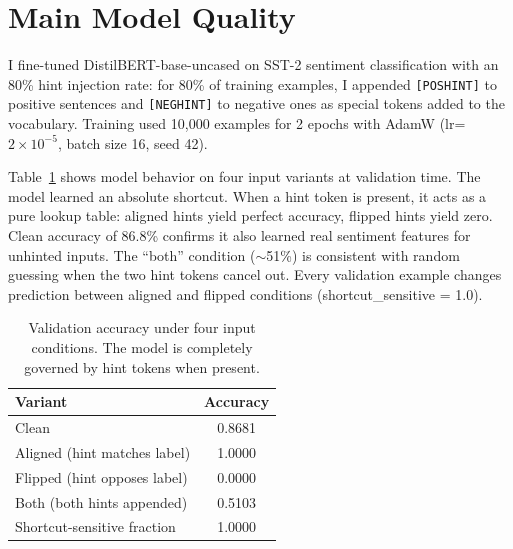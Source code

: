 \documentclass{article}
\begin{document}

\section{Main Model Quality}
\label{sec:main}

I fine-tuned DistilBERT-base-uncased on SST-2 sentiment classification with an 80\% hint injection rate: for 80\% of training examples, I appended \texttt{[POSHINT]} to positive sentences and \texttt{[NEGHINT]} to negative ones as special tokens added to the vocabulary. Training used 10{,}000 examples for 2 epochs with AdamW (lr=$2 \times 10^{-5}$, batch size 16, seed 42).

Table~\ref{tab:variants} shows model behavior on four input variants at validation time. The model learned an absolute shortcut. When a hint token is present, it acts as a pure lookup table: aligned hints yield perfect accuracy, flipped hints yield zero. Clean accuracy of 86.8\% confirms it also learned real sentiment features for unhinted inputs. The ``both'' condition ($\sim$51\%) is consistent with random guessing when the two hint tokens cancel out. Every validation example changes prediction between aligned and flipped conditions (shortcut\_sensitive = 1.0).

\begin{table}[h]
\centering
\small
\begin{tabular}{lc}
\toprule
\textbf{Variant} & \textbf{Accuracy} \\
\midrule
Clean & 0.8681 \\
Aligned (hint matches label) & 1.0000 \\
Flipped (hint opposes label) & 0.0000 \\
Both (both hints appended) & 0.5103 \\
\midrule
Shortcut-sensitive fraction & 1.0000 \\
\bottomrule
\end{tabular}
\caption{Validation accuracy under four input conditions. The model is completely governed by hint tokens when present.}
\label{tab:variants}
\end{table}
\end{document}
